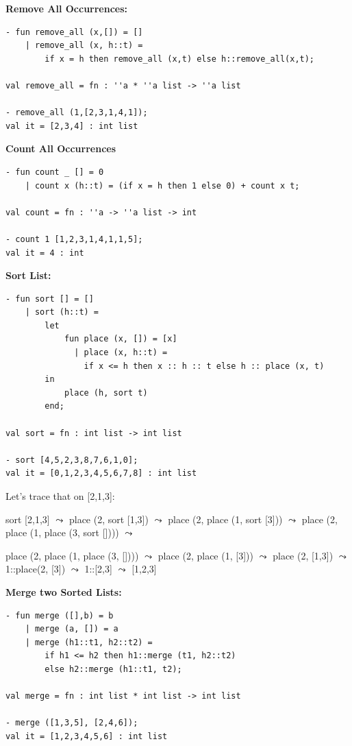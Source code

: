 \textbf{Remove All Occurrences:}
\begin{verbatim}
- fun remove_all (x,[]) = []
    | remove_all (x, h::t) =
        if x = h then remove_all (x,t) else h::remove_all(x,t);

val remove_all = fn : ''a * ''a list -> ''a list

- remove_all (1,[2,3,1,4,1]);
val it = [2,3,4] : int list 
\end{verbatim}

\textbf{Count All Occurrences}

\begin{verbatim}
- fun count _ [] = 0
    | count x (h::t) = (if x = h then 1 else 0) + count x t;

val count = fn : ''a -> ''a list -> int

- count 1 [1,2,3,1,4,1,1,5];
val it = 4 : int
\end{verbatim}

\textbf{Sort List:}

\begin{verbatim}
- fun sort [] = []
    | sort (h::t) =
        let
            fun place (x, []) = [x]
              | place (x, h::t) =
                if x <= h then x :: h :: t else h :: place (x, t)
        in
            place (h, sort t)
        end;

val sort = fn : int list -> int list

- sort [4,5,2,3,8,7,6,1,0];
val it = [0,1,2,3,4,5,6,7,8] : int list
\end{verbatim}
Let's trace that on [2,1,3]:

sort [2,1,3] $\leadsto$
place (2, sort [1,3]) $\leadsto$
place (2, place (1, sort [3])) $\leadsto$
place (2, place (1, place (3, sort []))) $\leadsto$

place (2, place (1, place (3, []))) $\leadsto$
place (2, place (1, [3])) $\leadsto$
place (2, [1,3]) $\leadsto$
1::place(2, [3]) $\leadsto$
1::[2,3] $\leadsto$
[1,2,3] 

\textbf{Merge two Sorted Lists:}
\begin{verbatim}
- fun merge ([],b) = b
    | merge (a, []) = a
    | merge (h1::t1, h2::t2) =
        if h1 <= h2 then h1::merge (t1, h2::t2)
        else h2::merge (h1::t1, t2);

val merge = fn : int list * int list -> int list

- merge ([1,3,5], [2,4,6]);
val it = [1,2,3,4,5,6] : int list
\end{verbatim}




